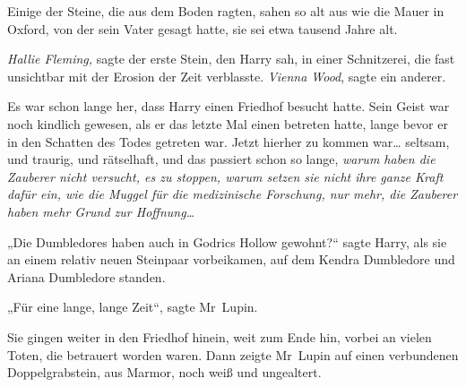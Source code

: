 Einige der Steine, die aus dem Boden ragten, sahen so alt aus wie die Mauer in Oxford, von der sein Vater gesagt hatte, sie sei etwa tausend Jahre alt.

\emph{Hallie Fleming,} sagte der erste Stein, den Harry sah, in einer Schnitzerei, die fast unsichtbar mit der Erosion der Zeit verblasste. \emph{Vienna Wood}, sagte ein anderer.

Es war schon lange her, dass Harry einen Friedhof besucht hatte. Sein Geist war noch kindlich gewesen, als er das letzte Mal einen betreten hatte, lange bevor er in den Schatten des Todes getreten war. Jetzt hierher zu kommen war… seltsam, und traurig, und rätselhaft, und das passiert schon so lange, \emph{warum haben die Zauberer nicht versucht, es zu stoppen, warum setzen sie nicht ihre ganze Kraft dafür ein, wie die Muggel für die medizinische Forschung, nur mehr, die Zauberer haben mehr Grund zur Hoffnung…}

„Die Dumbledores haben auch in Godrics Hollow gewohnt?“ sagte Harry, als sie an einem relativ neuen Steinpaar vorbeikamen, auf dem Kendra Dumbledore und Ariana Dumbledore standen.

„Für eine lange, lange Zeit“, sagte Mr~Lupin.


Sie gingen weiter in den Friedhof hinein, weit zum Ende hin, vorbei an vielen Toten, die betrauert worden waren. Dann zeigte Mr~Lupin auf einen verbundenen Doppelgrabstein, aus Marmor, noch weiß und ungealtert.

